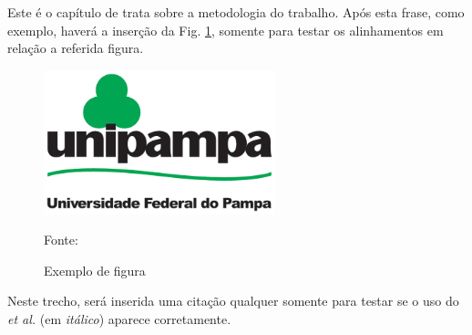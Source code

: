 Este é o capítulo de trata sobre a metodologia do trabalho. Após esta frase, como exemplo, haverá a inserção da Fig. \ref{fig:unipampa}, somente para testar os alinhamentos em relação a referida figura.

\begin{figure}[h]
\caption{Exemplo de figura}
\centering
\includegraphics[width=0.6\textwidth]{unipampa.png}
\label{fig:unipampa}
\par \raggedright \hspace{3.0cm} {\footnotesize Fonte: \cite{UnipampaVisual}}
\end{figure}

Neste trecho, será inserida uma citação qualquer \cite{goossens04thelatexgraphics} somente para testar se o uso do \textit{et al.} (em \textit{itálico}) aparece corretamente. 